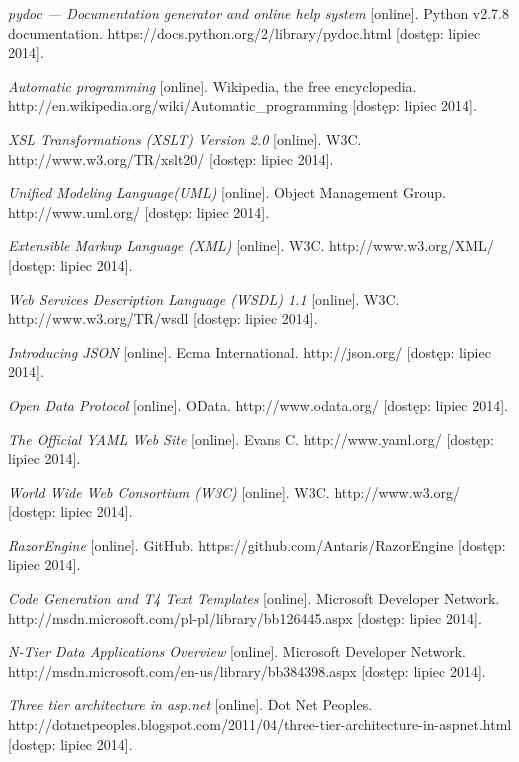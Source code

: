 \begin{thebibliography}{}
  \emph{pydoc — Documentation generator and online help system} [online].
  Python v2.7.8 documentation.
  https://docs.python.org/2/library/pydoc.html [dostęp: lipiec 2014].
 
  \emph{Automatic programming} [online].
  Wikipedia, the free encyclopedia.
  http://en.wikipedia.org/wiki/Automatic\_programming [dostęp: lipiec 2014].
 
  \emph{XSL Transformations (XSLT) Version 2.0} [online].
  W3C.
  http://www.w3.org/TR/xslt20/ [dostęp: lipiec 2014].
 
  \emph{Unified Modeling Language\texttrademark (UML\textregistered)} [online].
  Object Management Group.
  http://www.uml.org/ [dostęp: lipiec 2014].
 
  \emph{Extensible Markup Language (XML)} [online].
  W3C.
  http://www.w3.org/XML/ [dostęp: lipiec 2014].
 
  \emph{Web Services Description Language (WSDL) 1.1} [online].
  W3C.
  http://www.w3.org/TR/wsdl [dostęp: lipiec 2014].
  
  \emph{Introducing JSON} [online].
  Ecma International.
  http://json.org/ [dostęp: lipiec 2014].
 
  \emph{Open Data Protocol} [online].
  OData.
  http://www.odata.org/ [dostęp: lipiec 2014].
 
  \emph{The Official YAML Web Site} [online].
  Evans C.
  http://www.yaml.org/ [dostęp: lipiec 2014].
 
  \emph{World Wide Web Consortium (W3C)} [online].
  W3C.
  http://www.w3.org/ [dostęp: lipiec 2014].
 
  \emph{RazorEngine} [online].
  GitHub.
  https://github.com/Antaris/RazorEngine [dostęp: lipiec 2014].

  \emph{Code Generation and T4 Text Templates} [online].
  Microsoft Developer Network.
  http://msdn.microsoft.com/pl-pl/library/bb126445.aspx [dostęp: lipiec 2014].
 
  \emph{N-Tier Data Applications Overview} [online].
  Microsoft Developer Network.
  http://msdn.microsoft.com/en-us/library/bb384398.aspx [dostęp: lipiec 2014].
 
  \emph{Three tier architecture in asp.net} [online].
  Dot Net Peoples.
  http://dotnetpeoples.blogspot.com/2011/04/three-tier-architecture-in-aspnet.html [dostęp: lipiec 2014].


\end{thebibliography}
